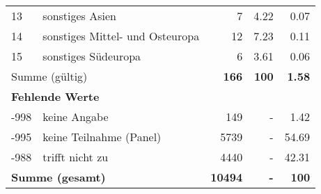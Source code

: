 \begin{longtable}{lXrrr}
     13 &
     \multicolumn{1}{X}{ sonstiges Asien   } &


       \num{7} &
       \num[round-mode=places,round-precision=2]{4,22} &
         \num[round-mode=places,round-precision=2]{0,07} \\

     14 &
     \multicolumn{1}{X}{ sonstiges Mittel- und Osteuropa   } &


       \num{12} &
       \num[round-mode=places,round-precision=2]{7,23} &
         \num[round-mode=places,round-precision=2]{0,11} \\

     15 &
     \multicolumn{1}{X}{ sonstiges Südeuropa   } &


       \num{6} &
       \num[round-mode=places,round-precision=2]{3,61} &
         \num[round-mode=places,round-precision=2]{0,06} \\
     \midrule
     \multicolumn{2}{l}{Summe (gültig)} &
       \textbf{\num{166}} &
     \textbf{100} &
       \textbf{\num[round-mode=places,round-precision=2]{1,58}} \\
     \multicolumn{5}{l}{\textbf{Fehlende Werte}}\\
       -998 &
       keine Angabe &
         \num{149} &
        - &
         \num[round-mode=places,round-precision=2]{1,42} \\
       -995 &
       keine Teilnahme (Panel) &
         \num{5739} &
        - &
         \num[round-mode=places,round-precision=2]{54,69} \\
       -988 &
       trifft nicht zu &
         \num{4440} &
        - &
         \num[round-mode=places,round-precision=2]{42,31} \\
     \midrule
     \multicolumn{2}{l}{\textbf{Summe (gesamt)}} &
          \textbf{\num{10494}} &
        \textbf{-} &
        \textbf{100} \\
     \bottomrule
     \end{longtable}
     
